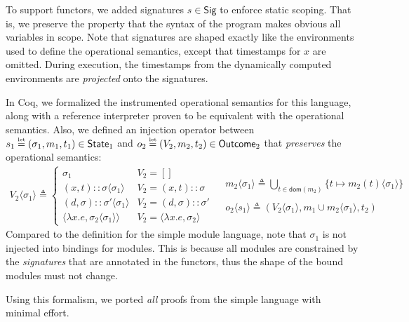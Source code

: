 \documentclass[acmsmall,screen,review]{acmart}\settopmatter{printfolios=true,printccs=false,printacmref=false}
\theoremstyle{acmdefinition}
\newcommand*{\cons}{::}
\newcommand*{\modid}{d}
\newcommand*{\ctx}{\sigma}
\newcommand*{\Sig}{\mathsf{Sig}}
\newcommand*{\mem}{m}
\newcommand*{\texteq}[1]{\stackrel{\mathclap{\tiny\normalfont\mbox{#1}}}{=}}
\newcommand*{\State}{\mathsf{State}}
\newcommand*{\Outcome}{\mathsf{Outcome}}
\newcommand*{\inject}[2]{{#2}\langle{#1}\rangle}
\begin{document}
To support functors, we added signatures $s\in\Sig$ to enforce static scoping.
That is, we preserve the property that the syntax of the program makes obvious all variables in scope.
Note that signatures are shaped exactly like the environments used to define the operational semantics, except that timestamps for $x$ are omitted.
During execution, the timestamps from the dynamically computed environments are \emph{projected} onto the signatures.

In Coq, we formalized the instrumented operational semantics for this language, along with a reference interpreter proven to be equivalent with the operational semantics.
Also, we defined an injection operator between $s_1\texteq{let}(\ctx_1,\mem_1,t_1)\in\State_1$ and $o_2\texteq{let}(V_2,\mem_2,t_2)\in\Outcome_2$ that \emph{preserves} the operational semantics:
\[
  \begin{array}{cc}
    \inject{\ctx_{1}}{V_{2}}\triangleq
    \begin{cases}
      \ctx_1                                            & V_{2}=[]                               \\
      (x, t)\cons\inject{\ctx_{1}}{\ctx}                & V_{2}=(x,t)\cons \ctx                  \\
      (\modid, \ctx)\cons\inject{\ctx_{1}}{\ctx'}       & V_{2}=(\modid,\ctx)\cons \ctx'         \\
      \langle\lambda x.e,\inject{\ctx_1}{\ctx_2}\rangle & V_{2}=\langle\lambda x.e,\ctx_2\rangle
    \end{cases} &
    \begin{array}{l}
      \inject{\ctx_1}{\mem_2}\triangleq
      \displaystyle\bigcup_{t\in\mathsf{dom}(\mem_2)}\{t\mapsto\inject{\ctx_1}{\mem_2(t)}\} \\ \\
      \inject{s_1}{o_2}\triangleq
      (\inject{\ctx_1}{V_2},\mem_1\cup\inject{\ctx_1}{\mem_2},t_2)
    \end{array}
  \end{array}
\]
Compared to the definition for the simple module language, note that $\ctx_1$ is not injected into bindings for modules.
This is because all modules are constrained by the \emph{signatures} that are annotated in the functors, thus the shape of the bound modules must not change.

Using this formalism, we ported \emph{all} proofs from the simple language with minimal effort.
\end{document}
